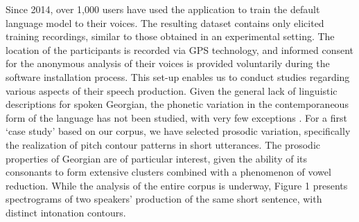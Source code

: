 \documentclass[12pt]{amsart}
\begin{document}
Since 2014, over 1,000 users have used the application to train the default language model to their voices. The resulting dataset contains only elicited training recordings, similar to those obtained in an experimental setting. %
The location of the participants is recorded via GPS technology, and informed consent for the anonymous analysis of their voices is provided voluntarily during the software installation process. This set-up enables us to conduct studies regarding various aspects of their speech production. Given the general lack of linguistic descriptions for spoken Georgian, the phonetic variation in the contemporaneous form of the language has not been studied, with very few exceptions \cite{Ch, CGB}.  For a first `case study' based on our corpus, we have selected prosodic variation, specifically the realization of pitch contour patterns in short utterances. The prosodic properties of Georgian are of particular interest, given the ability of its consonants to form extensive clusters \cite{Ch} combined with a phenomenon of vowel reduction. While the analysis of the entire corpus is underway, Figure 1 presents spectrograms of two speakers' production of the same short sentence, with distinct intonation contours. %
\end{document}
